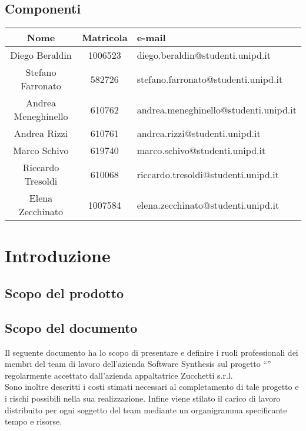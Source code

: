 \subsection{Componenti}
\begin{center}
\begin{tabularx}{0.9\textwidth}{c|c|l}
{\bf Nome}&{\bf Matricola}&{\bf e-mail}\\ 
\hline
\multirow{2}{*}{Diego Beraldin} & \multirow{2}{*}{1006523}&\multirow{2}{*}{diego.beraldin@studenti.unipd.it}\\&&\\
\multirow{2}{*}{Stefano Farronato} &\multirow{2}{*}{582726}&\multirow{2}{*}{stefano.farronato@studenti.unipd.it}\\&&\\
\multirow{2}{*}{Andrea Meneghinello} &\multirow{2}{*}{610762}&\multirow{2}{*}{andrea.meneghinello@studenti.unipd.it}\\&&\\
\multirow{2}{*}{Andrea Rizzi} &\multirow{2}{*}{610761}&\multirow{2}{*}{andrea.rizzi@studenti.unipd.it}\\&&\\
\multirow{2}{*}{Marco Schivo} &\multirow{2}{*}{619740}&\multirow{2}{*}{marco.schivo@studenti.unipd.it}\\&&\\
\multirow{2}{*}{Riccardo Tresoldi} &\multirow{2}{*}{610068}&\multirow{2}{*}{riccardo.tresoldi@studenti.unipd.it}\\&&\\
\multirow{2}{*}{Elena Zecchinato}&\multirow{2}{*}{1007584}&\multirow{2}{*}{elena.zecchinato@studenti.unipd.it}\\&&\\
\end{tabularx}
\end{center}

\clearpage
\section{Introduzione}
\subsection{Scopo del prodotto}
\purpose

\subsection{Scopo del documento}
Il seguente documento ha lo scopo di presentare e definire i ruoli professionali dei membri del team di lavoro dell'azienda Software Synthesis sul progetto ``\caName'' regolarmente accettato dall'azienda appaltatrice Zucchetti s.r.l.\\
Sono inoltre descritti i costi stimati necessari al completamento di tale progetto e i rischi possibili nella sua realizzazione. Infine viene stilato il carico di lavoro distribuito per ogni soggetto del team mediante un organigramma specificante tempo e risorse.
